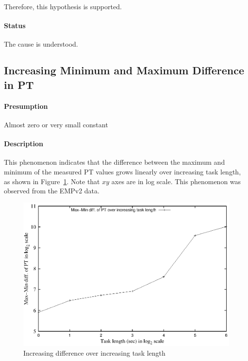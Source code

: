 \documentclass[10pt]{article}
\begin{document}
Therefore, this hypothesis is supported. 

\paragraph{Status} The cause is understood.

\newpage

\subsection{Increasing Minimum and Maximum Difference in PT}

\paragraph{Presumption} Almost zero or very small constant

\paragraph{Description} 
This phenomenon indicates that the difference between the maximum and minimum of the measured PT values 
grows linearly over increasing task length, as shown in Figure~\ref{fig:mm_pt_dist}. 
Note that $xy$ axes are in log scale. 
This phenomenon was observed from the EMPv2 data.


\begin{figure}[H]
\centering
\includegraphics[scale=0.8]{figures/sodb8-ntp-on-turbo-on/overall_pt_diff.eps}
\caption{Increasing difference over increasing task length~\label{fig:mm_pt_dist}}
\end{figure}
\end{document}
